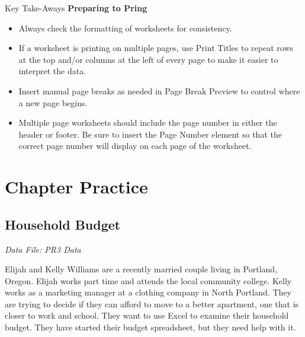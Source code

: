 \begin{center}
	\begin{tkwbox}{Key Take-Aways}
		\textbf{Preparing to Pring}
		\\
		\begin{itemize}
			\setlength{\itemsep}{0pt}
			\setlength{\parskip}{0pt}
			\setlength{\parsep}{0pt}

			\item Always check the formatting of worksheets for consistency.
			\item If a worksheet is printing on multiple pages, use Print Titles to repeat rows at the top and/or columns at the left of every page to make it easier to interpret the data.
			\item Insert manual page breaks as needed in Page Break Preview to control where a new page begins.
			\item Multiple page worksheets should include the page number in either the header or footer. Be sure to insert the Page Number element so that the correct page number will display on each page of the worksheet.
			
		\end{itemize}
	\end{tkwbox}
\end{center}

\section{Chapter Practice}

\subsection{Household Budget}

\textit{Data File: PR3 Data}

Elijah and Kelly Williams are a recently married couple living in Portland, Oregon. Elijah works part time and attends the local community college. Kelly works as a marketing manager at a clothing company in North Portland. They are trying to decide if they can afford to move to a better apartment, one that is closer to work and school. They want to use Excel to examine their household budget. They have started their budget spreadsheet, but they need help with it.

